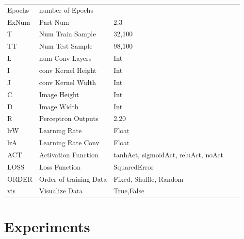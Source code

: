 \documentclass{article}
\begin{document}
\begin{table}[]
\begin{tabular}{l|llll}
 Epochs& number of Epochs    &  &  &  \\
 ExNum & Part Num            & 2,3&  &  \\
 T     & Num Train Sample    & 32,100 &  &  \\
 TT    & Num Test  Sample    & 98,100 &  & \\
 L     & num Conv Layers    & Int & \\
 I     & conv Kernel Height  & Int &  & \\
 J     & conv Kernel Width   & Int &  & \\
 C     & Image Height        & Int &  & \\
 D     & Image Width         & Int &  & \\
 R     & Perceptron Outputs  & 2,20 &  & \\
 lrW   & Learning Rate       & Float &  & \\
 lrA   & Learning Rate Conv  & Float &  & \\
 ACT   & Activation Function & tanhAct, sigmoidAct, reluAct, noAct &  & \\
 LOSS  & Loss Function       & SquaredError  &  & \\
ORDER& Order of training Data&Fixed, Shuffle, Random\\
 vis   & Visualize Data      & True,False &  & \\
\end{tabular}
\end{table}


\section{Experiments}
\end{document}
